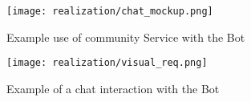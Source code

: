 

\begin{figure}
    \centering
    \texttt{[image: realization/chat\_mockup.png]}
    \caption{Example use of community Service with the Bot}
    \label{fig:chatMockup}
\end{figure}

\begin{figure}
    \centering
    \texttt{[image: realization/visual\_req.png]}
    \caption{Example of a chat interaction with the Bot}
    \label{fig:visualReq}
\end{figure}